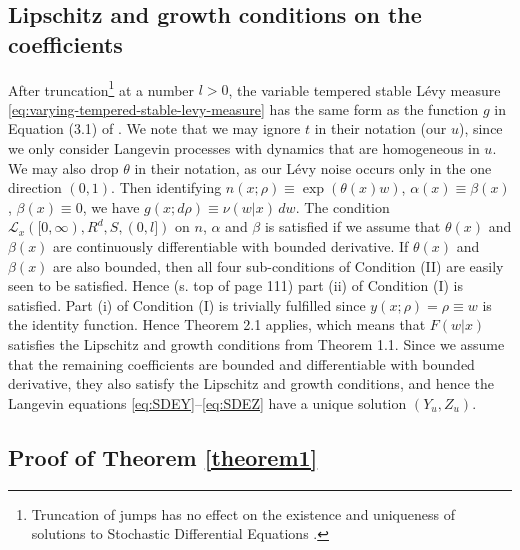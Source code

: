 \documentclass[a4paper,12pt]{elsarticle}
\numberwithin{equation}{section}
\theoremstyle{plain}
\theoremstyle{definition}
\theoremstyle{remark}
\numberwithin{equation}{section}
\newcommand{\1}{\mathbf 1}
\begin{document}
\subsection{Lipschitz and growth conditions on the coefficients} 
\label{subsec:Lip-gro}
After truncation\footnote{Truncation of jumps has no effect on the existence and 
uniqueness of solutions to Stochastic Differential Equations \citep{Applebaum}.} 
at a number $l > 0$, the variable tempered stable L\'evy 
measure 
\eqref{eq:varying-tempered-stable-levy-measure}
has the same form as the function $g$ in Equation (3.1) of 
\citep{Tsuchiya1992}.  
We note that we may ignore $t$ in their notation (our $u$), since we only 
consider Langevin processes with dynamics that are homogeneous in $u$.
We may also drop $\theta$ in their notation, as our L\'evy noise occurs only 
in the one direction $(0,1)$. 
Then identifying $n(x;\rho) \equiv \exp(\theta(x) w)$, 
$\alpha(x) \equiv \beta(x)$, $\beta(x) \equiv 0$, 
we have $g(x;d\rho) \equiv \nu(w|x)\,dw$. 
The condition $\mathcal L_x([0,\infty), R^d, S, (0,l])$ on $n$, $\alpha$ and 
$\beta$ is satisfied if we assume that $\theta(x)$ and $\beta(x)$ are 
continuously differentiable with bounded derivative. 
If $\theta(x)$ and $\beta(x)$ are also bounded, then all four sub-conditions of 
Condition (II) are easily seen to be satisfied.  
Hence (s. top of page 111) part (ii) of Condition (I) is satisfied. 
Part (i) of Condition (I) is trivially fulfilled since 
$y(x; \rho) = \rho \equiv w$ is the identity function. 
Hence Theorem 2.1 applies, which means that $F(w|x)$ satisfies the Lipschitz 
and growth conditions from Theorem 1.1. 
Since we assume that the remaining coefficients are bounded and differentiable 
with bounded derivative, they also satisfy the Lipschitz and growth conditions, 
and hence the Langevin equations \eqref{eq:SDEY}--\eqref{eq:SDEZ} have a unique 
solution $(Y_u, Z_u)$.


\subsection{Proof of Theorem \ref{theorem1}}
\end{document}
